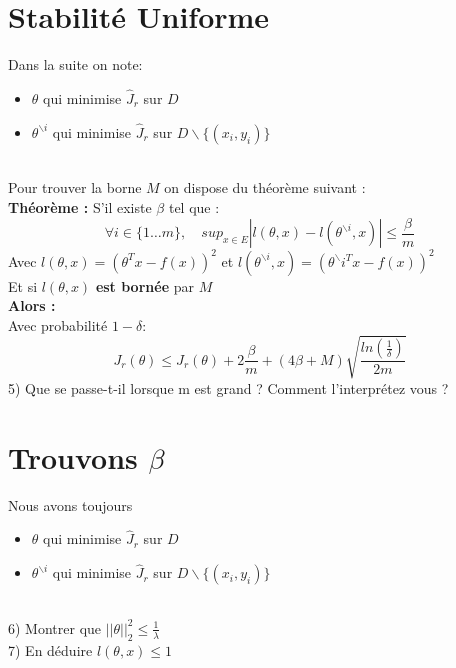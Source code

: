 \documentclass[12pt]{article}
\begin{document}
\section{ Stabilité Uniforme }   
Dans la suite on note:   
\begin{itemize}
\item $\theta$ qui minimise $\hat{J}_r$ sur $D$ 
\item $\theta^{ \backslash i}$  qui minimise $\hat{J}_r$ sur $D \backslash \{(x_i,y_i)\}$       
   
\end{itemize} \ \\

Pour trouver la borne $M$ on dispose du théorème suivant :  \\ 
\textbf{Théorème :} S'il existe $\beta$ tel que :  
$$ \forall i \in \{1 \dots m \},  \quad sup_{x \in E} |l(\theta,x)-l(\theta^{ \backslash i},x)| \leq \frac{\beta}{m}$$   
Avec $l(\theta,x) = (\theta^{T} x - f(x))^2$ et    $l(\theta^{\backslash i},x) = (\theta^\backslash{i}^{T} x - f(x))^2$    \\
Et si $l(\theta,x)$ \textbf{est bornée} par $M$  \\
\textbf{Alors :}    \\
Avec probabilité $1-\delta$:     
$$ J_r(\theta) \leq \hat{J}_r(\theta) + 2 \frac{\beta}{m} + (4\beta + M)\sqrt{\frac{ln(\frac{1}{\delta})}{2m}} $$   
5) Que se passe-t-il lorsque m est grand ? Comment l'interprétez vous ?

\section{Trouvons $\beta$}
Nous avons toujours    
\begin{itemize}
\item $\theta$ qui minimise $\hat{J}_r$ sur $D$ 
\item $\theta^{ \backslash i}$  qui minimise $\hat{J}_r$ sur $D \backslash \{(x_i,y_i)\}$       
   
\end{itemize} \ \\
6) Montrer que $||\theta||^2_2 \leq \frac{1}{\lambda}$    \\
7) En déduire $l(\theta,x) \leq 1$      \\ \\
    
\end{document}
